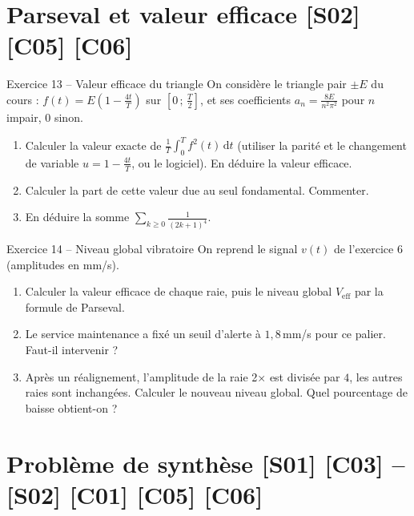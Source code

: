 \documentclass[a4paper,11pt]{article}
\begin{document}
\needspace{7cm}
\section{Parseval et valeur efficace \hfill {\normalsize\color{uimmred}[S02] [C05] [C06]}}

\begin{exo}{Exercice 13 -- Valeur efficace du triangle}
\label{exo:13}
On considère le triangle pair $\pm E$ du cours : $f(t) = E\left(1 - \frac{4t}{T}\right)$ sur $\left[0\,;\,\frac T2\right]$, et ses coefficients $a_n = \frac{8E}{n^2\pi^2}$ pour $n$ impair, $0$ sinon.
\begin{enumerate}[label=\alph*)]
  \item Calculer la valeur exacte de $\frac1T\int_0^T f^2(t)\,\mathrm dt$ (utiliser la parité et le changement de variable $u = 1-\frac{4t}{T}$, ou le logiciel). En déduire la valeur efficace.
  \item Calculer la part de cette valeur due au seul fondamental. Commenter.
  \item En déduire la somme $\displaystyle\sum_{k\geq 0}\frac{1}{(2k+1)^4}$.
\end{enumerate}
\end{exo}

\begin{exo}{Exercice 14 -- Niveau global vibratoire}
\label{exo:14}
On reprend le signal $v(t)$ de l'exercice 6 (amplitudes en mm/s).
\begin{enumerate}[label=\alph*)]
  \item Calculer la valeur efficace de chaque raie, puis le niveau global $V_{\text{eff}}$ par la formule de Parseval.
  \item Le service maintenance a fixé un seuil d'alerte à $1{,}8$\,mm/s pour ce palier. Faut-il intervenir ?
  \item Après un réalignement, l'amplitude de la raie 2× est divisée par $4$, les autres raies sont inchangées. Calculer le nouveau niveau global. Quel pourcentage de baisse obtient-on ?
\end{enumerate}
\end{exo}

\needspace{7cm}
\section{Problème de synthèse \hfill {\normalsize\color{uimmred}[S01] [C03] -- [S02] [C01] [C05] [C06]}}
\end{document}
